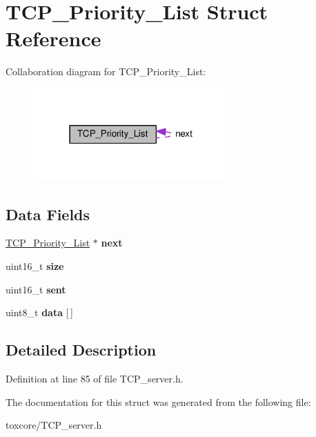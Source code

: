 \hypertarget{struct_t_c_p___priority___list}{\section{T\+C\+P\+\_\+\+Priority\+\_\+\+List Struct Reference}
\label{struct_t_c_p___priority___list}
}


Collaboration diagram for T\+C\+P\+\_\+\+Priority\+\_\+\+List\+:
\nopagebreak
\begin{figure}[H]
\begin{center}
\leavevmode
\includegraphics[width=214pt]{struct_t_c_p___priority___list__coll__graph}
\end{center}
\end{figure}
\subsection*{Data Fields}
\begin{DoxyCompactItemize}
\item 
\hypertarget{struct_t_c_p___priority___list_ac4565314423a94bcf735245b8b9b4c53}{\hyperlink{struct_t_c_p___priority___list}{T\+C\+P\+\_\+\+Priority\+\_\+\+List} $\ast$ {\bfseries next}}\label{struct_t_c_p___priority___list_ac4565314423a94bcf735245b8b9b4c53}

\item 
\hypertarget{struct_t_c_p___priority___list_aaba88b24a21a6c70c895c0d55f4a69a0}{uint16\+\_\+t {\bfseries size}}\label{struct_t_c_p___priority___list_aaba88b24a21a6c70c895c0d55f4a69a0}

\item 
\hypertarget{struct_t_c_p___priority___list_a61e6f322b3c26ac891710463676b5185}{uint16\+\_\+t {\bfseries sent}}\label{struct_t_c_p___priority___list_a61e6f322b3c26ac891710463676b5185}

\item 
\hypertarget{struct_t_c_p___priority___list_a5c239a1bb87b52b0f1d6d68c4749cd2a}{uint8\+\_\+t {\bfseries data} \mbox{[}$\,$\mbox{]}}\label{struct_t_c_p___priority___list_a5c239a1bb87b52b0f1d6d68c4749cd2a}

\end{DoxyCompactItemize}


\subsection{Detailed Description}


Definition at line 85 of file T\+C\+P\+\_\+server.\+h.



The documentation for this struct was generated from the following file\+:\begin{DoxyCompactItemize}
\item 
toxcore/T\+C\+P\+\_\+server.\+h\end{DoxyCompactItemize}
